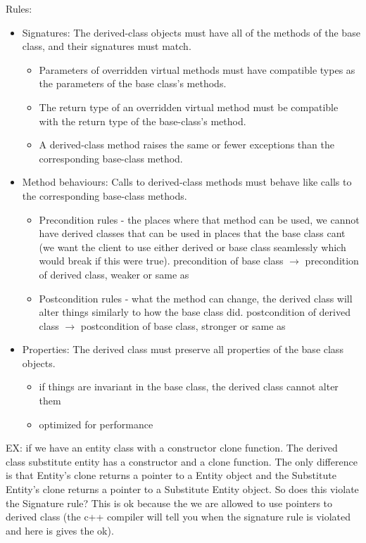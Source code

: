 \documentclass[12pt]{article}
\begin{document}
Rules:
\begin{itemize}
    \item Signatures: The derived-class objects must have all of the methods of the base class, and their signatures must match.
    \begin{itemize}
        \item  Parameters of overridden virtual methods must have compatible types as the parameters of the base class's methods.
        \item The return type of an overridden virtual method must be compatible with the return type of the base-class's method.
        \item A derived-class method raises the same or fewer exceptions than the corresponding base-class method.
    \end{itemize}
    \item Method behaviours: Calls to derived-class methods must behave like calls to the corresponding base-class methods.
    \begin{itemize}
        \item Precondition rules - the places where that method can be used, we cannot have derived classes that can be used in places that the base class cant (we want the client to use either derived or base class seamlessly which would break if this were true). precondition of base class $\rightarrow$ precondition of derived class, weaker or same as
        \item Postcondition rules - what the method can change, the derived class will alter things similarly to how the base class did. postcondition of derived class $\rightarrow$ postcondition of base class, stronger or same as
    \end{itemize}
    \item Properties: The derived class must preserve all properties of the base class objects.
    \begin{itemize}
        \item if things are invariant in the base class, the derived class cannot alter them
        \item optimized for performance
    \end{itemize}
\end{itemize}


EX: if we have an entity class with a constructor clone function. The derived class substitute entity has a constructor and a clone function. The only difference is that Entity's clone returns a pointer to a Entity object and the Substitute Entity's clone returns a pointer to a Substitute Entity object. So does this violate the Signature rule? This is ok because the we are allowed to use pointers to derived class (the c++ compiler will tell you when the signature rule is violated and here is gives the ok).
\end{document}
